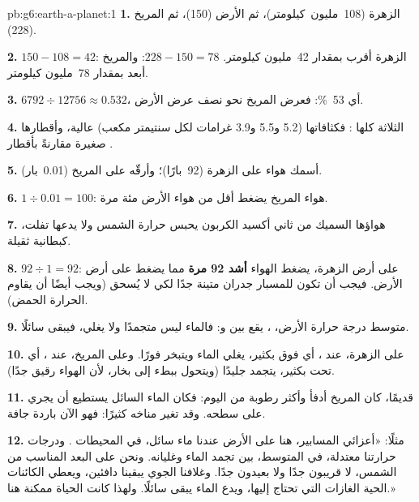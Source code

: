 \begin{solution}{pb:g6:earth-a-planet:1}
\textbf{1.} الزهرة (108~مليون~كيلومتر)، ثم الأرض (150)، ثم المريخ (228).

\textbf{2.} $150 - 108 = 42$: الزهرة أقرب بمقدار 42~مليون كيلومتر.
$228 - 150 = 78$: والمريخ أبعد بمقدار 78~مليون كيلومتر.

\textbf{3.} $6792 \div 12756 \approx 0.532$، أي 53~\%: فعرض المريخ نحو
نصف عرض الأرض.

\textbf{4.} الثلاثة كلها : فكثافاتها (5.2 و5.5 و3.9
غرامات لكل سنتيمتر مكعب) عالية، وأقطارها صغيرة
مقارنةً بأقطار .

\textbf{5.} أسمك هواء على الزهرة (92~بارًا)؛ وأرقّه على المريخ
(0.01~بار).

\textbf{6.} $1 \div 0.01 = 100$: هواء المريخ يضغط أقل من
هواء الأرض مئة مرة.

\textbf{7.} هواؤها السميك من ثاني أكسيد الكربون يحبس حرارة الشمس ولا
يدعها تفلت، كبطانية ثقيلة.

\textbf{8.} $92 \div 1 = 92$: على أرض الزهرة، يضغط الهواء
\textbf{أشد 92 مرة} مما يضغط على أرض الأرض. فيجب أن تكون للمسبار
جدران متينة جدًا لكي لا يُسحق (ويجب أيضًا أن يقاوم الحرارة
 الحمض).

\textbf{9.} متوسط درجة حرارة الأرض، ، يقع بين
 و: فالماء ليس متجمدًا ولا يغلي، فيبقى
سائلًا.

\textbf{10.} على الزهرة، عند ، أي فوق  بكثير، يغلي الماء
ويتبخر فورًا. وعلى المريخ، عند ،
أي تحت  بكثير، يتجمد جليدًا (ويتحول ببطء إلى
بخار، لأن الهواء رقيق جدًا).

\textbf{11.} قديمًا، كان المريخ أدفأ وأكثر رطوبة من اليوم: فكان الماء السائل
يستطيع أن يجري على سطحه. وقد تغير مناخه كثيرًا: فهو الآن
 باردة جافة.

\textbf{12.} مثلًا: «أعزائي المسابير، هنا على الأرض عندنا ماء سائل،
في المحيطات  . ودرجات حرارتنا معتدلة، 
في المتوسط، بين تجمد الماء وغليانه. ونحن على
البعد المناسب من الشمس، لا قريبون جدًا ولا بعيدون جدًا. وغلافنا
الجوي يبقينا دافئين، ويعطي الكائنات الحية الغازات التي تحتاج إليها، ويدع
الماء يبقى سائلًا. ولهذا كانت الحياة ممكنة هنا.»
\end{solution}
